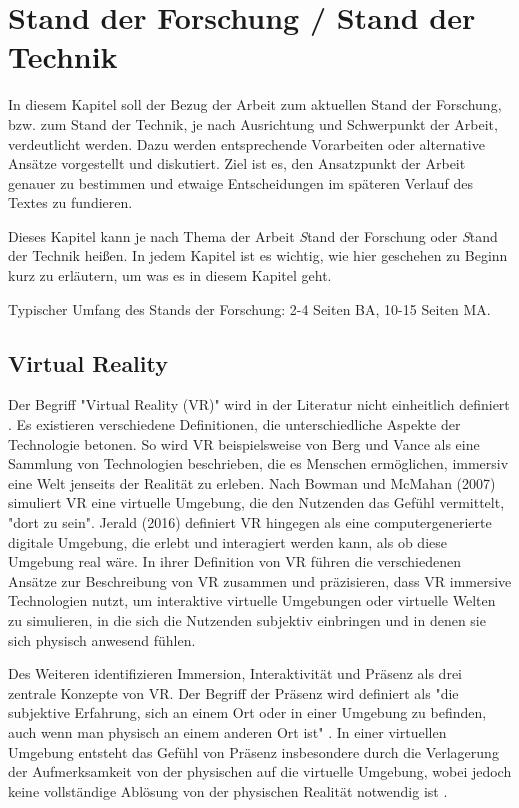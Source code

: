\chapter{Stand der Forschung / Stand der Technik}

In diesem Kapitel soll der Bezug der Arbeit zum aktuellen Stand der Forschung, bzw. zum Stand der Technik, je nach Ausrichtung und Schwerpunkt der Arbeit, verdeutlicht werden. Dazu werden entsprechende Vorarbeiten oder alternative Ansätze vorgestellt und diskutiert. Ziel ist es, den Ansatzpunkt der Arbeit genauer zu bestimmen und etwaige Entscheidungen im späteren Verlauf des Textes zu fundieren.

Dieses Kapitel kann je nach Thema der Arbeit {\emph Stand der Forschung} oder
{\emph Stand der Technik} heißen. In jedem Kapitel ist es wichtig, wie hier
geschehen zu Beginn kurz zu erläutern, um was es in diesem Kapitel geht.

Typischer Umfang des Stands der Forschung: 2-4 Seiten BA, 10-15 Seiten MA.

\section{Virtual Reality}

Der Begriff "Virtual Reality (VR)" wird in der Literatur nicht einheitlich definiert \citep{wohlgenannt_virtual_2020}. Es existieren verschiedene Definitionen, die unterschiedliche Aspekte der Technologie betonen. So wird VR beispielsweise von Berg und Vance als eine Sammlung von Technologien beschrieben, die es Menschen ermöglichen, immersiv eine Welt jenseits der Realität zu erleben. 
Nach Bowman und McMahan (2007) simuliert VR eine virtuelle Umgebung, die den Nutzenden das Gefühl vermittelt, "dort zu sein". Jerald (2016) definiert VR hingegen als eine computergenerierte digitale Umgebung, die erlebt und interagiert werden kann, als ob diese Umgebung real wäre. In ihrer Definition von VR führen \citet{wohlgenannt_virtual_2020} die verschiedenen Ansätze zur Beschreibung von VR zusammen und präzisieren, dass VR immersive Technologien nutzt, um interaktive virtuelle Umgebungen oder virtuelle Welten zu simulieren, in die sich die Nutzenden subjektiv einbringen und in denen sie sich physisch anwesend fühlen.

Des Weiteren identifizieren \citet{walsh_virtual_2002} Immersion, Interaktivität und Präsenz als drei zentrale Konzepte von VR. Der Begriff der Präsenz wird definiert als "die subjektive Erfahrung, sich an einem Ort oder in einer Umgebung zu befinden, auch wenn man physisch an einem anderen Ort ist" \citep{witmer_measuring_1998}. In einer virtuellen Umgebung entsteht das Gefühl von Präsenz insbesondere durch die Verlagerung der Aufmerksamkeit von der physischen auf die virtuelle Umgebung, wobei jedoch keine vollständige Ablösung von der physischen Realität notwendig ist \citep{witmer_measuring_1998}. 

